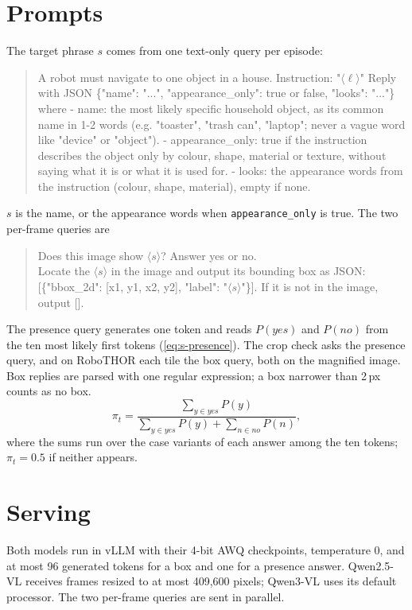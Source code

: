 \section{Prompts}
\label{sec:appA-prompts}
The target phrase $s$ comes from one text-only query per episode:
\begin{quote}\small\ttfamily
A robot must navigate to one object in a house. Instruction: "$\langle\ell\rangle$"
Reply with JSON \{"name": "...", "appearance\_only": true or false, "looks": "..."\} where
- name: the most likely specific household object, as its common name in 1-2 words (e.g. "toaster", "trash can",
"laptop"; never a vague word like "device" or "object").
- appearance\_only: true if the instruction describes the object only by colour, shape, material or texture,
without saying what it is or what it is used for.
- looks: the appearance words from the instruction (colour, shape, material), empty if none.
\end{quote}
$s$ is the name, or the appearance words when \texttt{appearance\_only} is true. The two per-frame queries are
\begin{quote}\small\ttfamily
Does this image show $\langle s\rangle$? Answer yes or no.\\[0.3em]
Locate the $\langle s\rangle$ in the image and output its bounding box as JSON: [\{"bbox\_2d": [x1, y1, x2, y2],
"label": "$\langle s\rangle$"\}]. If it is not in the image, output [].
\end{quote}
The presence query generates one token and reads $P(\textit{yes})$ and $P(\textit{no})$ from the ten most likely
first tokens (\cref{eq:s-presence}). The crop check asks the presence query, and on RoboTHOR each tile the box query, both on
the magnified image. Box replies are parsed with one regular expression; a box narrower than 2\,px counts as no box.
\begin{equation}
\pi_t=\frac{\sum_{y\in\textit{yes}}P(y)}{\sum_{y\in\textit{yes}}P(y)+\sum_{n\in\textit{no}}P(n)} ,
\label{eq:s-presence}
\end{equation}
where the sums run over the case variants of each answer among the ten tokens; $\pi_t=0.5$ if neither appears.

\section{Serving}
\label{sec:appA-serving}
Both models run in vLLM with their 4-bit AWQ checkpoints, temperature 0, and at most 96 generated tokens for a box
and one for a presence answer. Qwen2.5-VL receives frames resized to at most 409{,}600 pixels; Qwen3-VL uses its
default processor. The two per-frame queries are sent in parallel.
